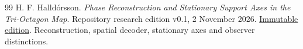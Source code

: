\begin{thebibliography}{99}
 H. F. Halld\'orsson.
\emph{Phase Reconstruction and Stationary Support Axes in the Tri-Octagon Map}.
Repository research edition v0.1, 2 November 2026.
\href{https://github.com/pzychozen/trioctagon-physics/tree/c881b682ef6a8128dd1dc316d1850b9aeb1e1c8b/papers/PHASE_RECONSTRUCTION_AND_STATIONARY_SUPPORT_AXES/publication/v0.1}{Immutable edition}.
Reconstruction, spatial decoder, stationary axes and observer distinctions.
\end{thebibliography}
